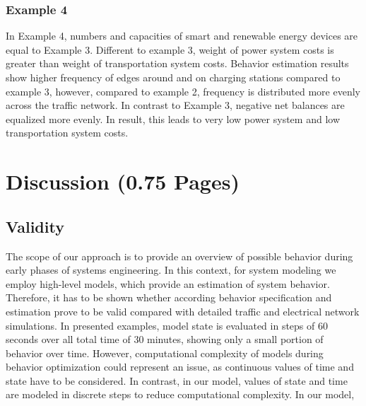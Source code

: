 \subsubsection{Example 4}

In Example 4, numbers and capacities of smart and renewable energy devices are equal to Example 3. Different to example 3, weight of power system costs is greater than weight of transportation system costs. Behavior estimation results show higher frequency of edges around and on charging stations compared to example 3, however, compared to example 2, frequency is distributed more evenly across the traffic network. In contrast to Example 3, negative net balances are equalized more evenly. In result, this leads to very low power system and low transportation system costs.

\section{Discussion (0.75 Pages)}
\label{section:discussion}

\subsection{Validity}

The scope of our approach is to provide an overview of possible behavior during early phases of systems engineering. In this context, for system modeling we employ high-level models, which provide an estimation of system behavior. Therefore, it has to be shown whether according behavior specification and estimation prove to be valid compared with detailed traffic and electrical network simulations. In presented examples, model state is evaluated in steps of 60 seconds over all total time of 30 minutes, showing only a small portion of behavior over time. 
However, computational complexity of models during behavior optimization could represent an issue, as continuous values of time and state have to be considered. In contrast, in our model, values of state and time are modeled in discrete steps to reduce computational complexity. In our model, 

